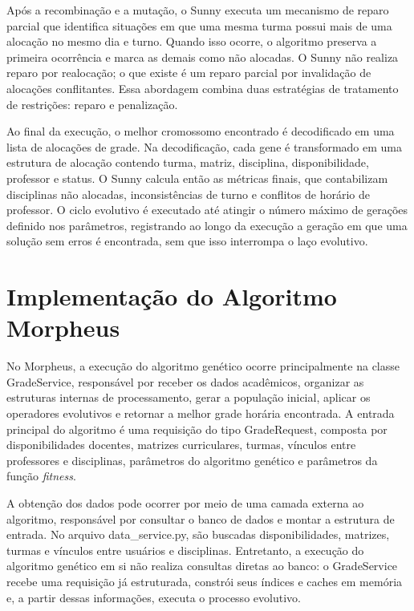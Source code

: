 Após a recombinação e a mutação, o Sunny executa um mecanismo de reparo parcial que identifica situações em que uma mesma turma possui mais de uma alocação no mesmo dia e turno. Quando isso ocorre, o algoritmo preserva a primeira ocorrência e marca as demais como não alocadas. O Sunny não realiza reparo por realocação; o que existe é um reparo parcial por invalidação de alocações conflitantes. Essa abordagem combina duas estratégias de tratamento de restrições: reparo e penalização.

Ao final da execução, o melhor cromossomo encontrado é decodificado em uma lista de alocações de grade. Na decodificação, cada gene é transformado em uma estrutura de alocação contendo turma, matriz, disciplina, disponibilidade, professor e status. O Sunny calcula então as métricas finais, que contabilizam disciplinas não alocadas, inconsistências de turno e conflitos de horário de professor. O ciclo evolutivo é executado até atingir o número máximo de gerações definido nos parâmetros, registrando ao longo da execução a geração em que uma solução sem erros é encontrada, sem que isso interrompa o laço evolutivo.

\section{Implementação do Algoritmo Morpheus}
\label{sec:7.2}

No Morpheus, a execução do algoritmo genético ocorre principalmente na classe GradeService, responsável por receber os dados acadêmicos, organizar as estruturas internas de processamento, gerar a população inicial, aplicar os operadores evolutivos e retornar a melhor grade horária encontrada. A entrada principal do algoritmo é uma requisição do tipo GradeRequest, composta por disponibilidades docentes, matrizes curriculares, turmas, vínculos entre professores e disciplinas, parâmetros do algoritmo genético e parâmetros da função \textit{fitness}.

A obtenção dos dados pode ocorrer por meio de uma camada externa ao algoritmo, responsável por consultar o banco de dados e montar a estrutura de entrada. No arquivo data\_service.py, são buscadas disponibilidades, matrizes, turmas e vínculos entre usuários e disciplinas. Entretanto, a execução do algoritmo genético em si não realiza consultas diretas ao banco: o GradeService recebe uma requisição já estruturada, constrói seus índices e caches em memória e, a partir dessas informações, executa o processo evolutivo.


